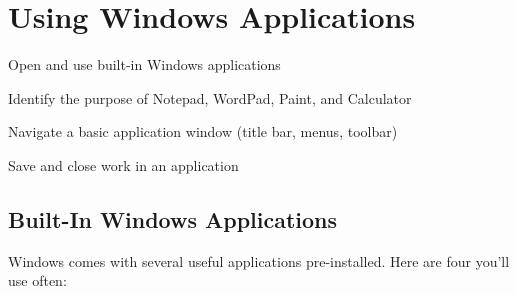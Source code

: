 
\chapter{Using Windows Applications}
\label{ch:apps}

\begin{objectives}
  \item Open and use built-in Windows applications
  \item Identify the purpose of Notepad, WordPad, Paint, and Calculator
  \item Navigate a basic application window (title bar, menus, toolbar)
  \item Save and close work in an application
\end{objectives}


\section{Built-In Windows Applications}
\label{sec:builtin-apps}

Windows comes with several useful applications pre-installed. Here are four you'll use often:

